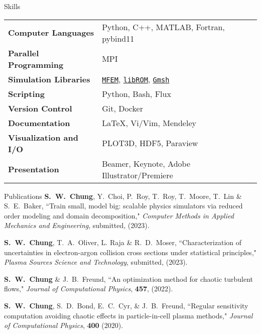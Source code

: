 \documentclass{resume} %
\begin{document}

\begin{rSection}{Skills}

\begin{tabular}{ @{} >{\bfseries}l @{\hspace{6ex}} l }
Computer Languages &  Python, C++, MATLAB, Fortran, pybind11 \\
Parallel Programming & MPI \\
Simulation Libraries & \href{https://mfem.org}{\texttt{MFEM}}, \href{https://www.librom.net/}{\texttt{libROM}}, \href{https://gmsh.info/}{\texttt{Gmsh}} \\
Scripting & Python, Bash, Flux \\
Version Control & Git, Docker \\
Documentation & \LaTeX, Vi/Vim, Mendeley \\
Visualization and I/O & PLOT3D, HDF5, Paraview \\
Presentation & Beamer, Keynote, Adobe Illustrator/Premiere \\
\end{tabular}

\end{rSection}

\clearpage
\begin{rSection}{Publications}
\textbf{S.\ W.\ Chung}, Y.\ Choi, P.\ Roy, T.\ Roy, T.\ Moore, T.\ Lin \& S.\ E.\ Baker,
``Train small, model big: scalable physics simulators via reduced order modeling and domain decomposition,"
\textit{Computer Methods in Applied Mechanics and Engineering}, submitted, (2023).
\par
\textbf{S.\ W.\ Chung}, T.\ A.\ Oliver, L. Raja \& R.\ D.\ Moser,
``Characterization of uncertainties in electron-argon collision cross sections under statistical principles,"
\textit{Plasma Sources Science and Technology}, submitted, (2023).
\par
\par
\textbf{S.\ W.\ Chung} \& J.\ B.\ Freund,
``An optimization method for chaotic turbulent flows,"
\textit{Journal of Computational Physics}, \textbf{457}, (2022).
\par
\textbf{S.\ W.\ Chung}, S.\ D.\ Bond, E.\ C.\ Cyr, \& J.\ B.\ Freund,
``Regular sensitivity computation avoiding chaotic effects in particle-in-cell plasma methods,"
\textit{Journal of Computational Physics}, \textbf{400} (2020).
\end{rSection}
\end{document}
